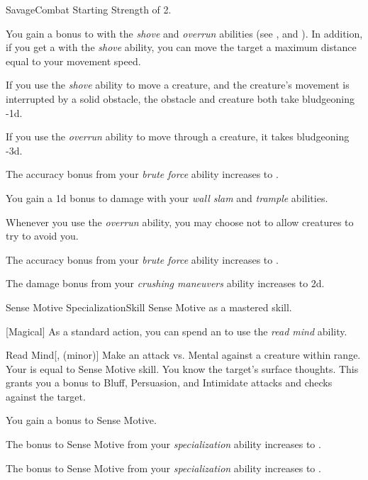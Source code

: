     \begin{feat}{Savage}{Combat}
        \featpre Starting Strength of 2.

         You gain a  bonus to  with the \textit{shove} and \textit{overrun} abilities (see , and ).
        In addition, if you get a  with the \textit{shove} ability, you can move the target a maximum distance equal to your movement speed.

         If you use the \textit{shove} ability to move a creature, and the creature's movement is interrupted by a solid obstacle, the obstacle and creature both take bludgeoning  -1d.

         If you use the \textit{overrun} ability to move through a creature, it takes bludgeoning  -3d.

         The accuracy bonus from your \textit{brute force} ability increases to .

         You gain a \plus1d bonus to damage with your \textit{wall slam} and \textit{trample} abilities.

         Whenever you use the \textit{overrun} ability, you may choose not to allow creatures to try to avoid you.

         The accuracy bonus from your \textit{brute force} ability increases to .

         The damage bonus from your \textit{crushing maneuvers} ability increases to \plus2d. 
    \end{feat}

    \begin{feat}{Sense Motive Specialization}{Skill}
        \featpre Sense Motive as a mastered skill.

        [Magical] As a standard action, you can spend an  to use the \textit{read mind} ability.
        \begin{ability}{Read Mind}[,  (minor)]
            Make an attack vs. Mental against a creature within \rngclose range.
            Your  is equal to Sense Motive skill.
            \hit You know the target's surface thoughts.
            This grants you a  bonus to Bluff, Persuasion, and Intimidate attacks and checks against the target.
        \end{ability}

         You gain a  bonus to Sense Motive.

         The bonus to Sense Motive from your \textit{specialization} ability increases to .

         The bonus to Sense Motive from your \textit{specialization} ability increases to .
    \end{feat}

